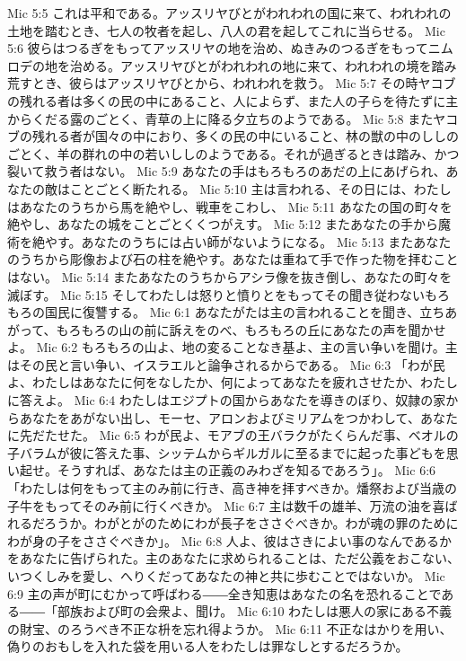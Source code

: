 Mic 5:5  これは平和である。アッスリヤびとがわれわれの国に来て、われわれの土地を踏むとき、七人の牧者を起し、八人の君を起してこれに当らせる。
Mic 5:6  彼らはつるぎをもってアッスリヤの地を治め、ぬきみのつるぎをもってニムロデの地を治める。アッスリヤびとがわれわれの地に来て、われわれの境を踏み荒すとき、彼らはアッスリヤびとから、われわれを救う。
Mic 5:7  その時ヤコブの残れる者は多くの民の中にあること、人によらず、また人の子らを待たずに主からくだる露のごとく、青草の上に降る夕立ちのようである。
Mic 5:8  またヤコブの残れる者が国々の中におり、多くの民の中にいること、林の獣の中のししのごとく、羊の群れの中の若いししのようである。それが過ぎるときは踏み、かつ裂いて救う者はない。
Mic 5:9  あなたの手はもろもろのあだの上にあげられ、あなたの敵はことごとく断たれる。
Mic 5:10  主は言われる、その日には、わたしはあなたのうちから馬を絶やし、戦車をこわし、
Mic 5:11  あなたの国の町々を絶やし、あなたの城をことごとくくつがえす。
Mic 5:12  またあなたの手から魔術を絶やす。あなたのうちには占い師がないようになる。
Mic 5:13  またあなたのうちから彫像および石の柱を絶やす。あなたは重ねて手で作った物を拝むことはない。
Mic 5:14  またあなたのうちからアシラ像を抜き倒し、あなたの町々を滅ぼす。
Mic 5:15  そしてわたしは怒りと憤りとをもってその聞き従わないもろもろの国民に復讐する。
Mic 6:1  あなたがたは主の言われることを聞き、立ちあがって、もろもろの山の前に訴えをのべ、もろもろの丘にあなたの声を聞かせよ。
Mic 6:2  もろもろの山よ、地の変ることなき基よ、主の言い争いを聞け。主はその民と言い争い、イスラエルと論争されるからである。
Mic 6:3  「わが民よ、わたしはあなたに何をなしたか、何によってあなたを疲れさせたか、わたしに答えよ。
Mic 6:4  わたしはエジプトの国からあなたを導きのぼり、奴隷の家からあなたをあがない出し、モーセ、アロンおよびミリアムをつかわして、あなたに先だたせた。
Mic 6:5  わが民よ、モアブの王バラクがたくらんだ事、ベオルの子バラムが彼に答えた事、シッテムからギルガルに至るまでに起った事どもを思い起せ。そうすれば、あなたは主の正義のみわざを知るであろう」。
Mic 6:6  「わたしは何をもって主のみ前に行き、高き神を拝すべきか。燔祭および当歳の子牛をもってそのみ前に行くべきか。
Mic 6:7  主は数千の雄羊、万流の油を喜ばれるだろうか。わがとがのためにわが長子をささぐべきか。わが魂の罪のためにわが身の子をささぐべきか」。
Mic 6:8  人よ、彼はさきによい事のなんであるかをあなたに告げられた。主のあなたに求められることは、ただ公義をおこない、いつくしみを愛し、へりくだってあなたの神と共に歩むことではないか。
Mic 6:9  主の声が町にむかって呼ばわる――全き知恵はあなたの名を恐れることである――「部族および町の会衆よ、聞け。
Mic 6:10  わたしは悪人の家にある不義の財宝、のろうべき不正な枡を忘れ得ようか。
Mic 6:11  不正なはかりを用い、偽りのおもしを入れた袋を用いる人をわたしは罪なしとするだろうか。
